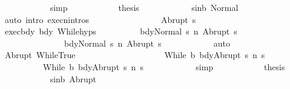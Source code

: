 \begin{isabellebody}
\ \ \ \ \ \ \ \ \ \ \isamarkupfalse%
\ simp\isanewline
\ \ \ \ \ \ \ \ \isamarkupfalse%
\ \isamarkupfalse%
\ {\isacharquery}thesis\isanewline
\ \ \ \ \ \ \ \ \ \ \isamarkupfalse%
\ s{\isacharunderscore}in{\isacharunderscore}b\ Normal\isanewline
\ \ \ \ \ \ \ \ \ \ \isamarkupfalse%
\ {\isacharparenleft}auto\ intro{\isacharcolon}\ execn{\isachardot}intros{\isacharparenright}\isanewline
\ \ \ \ \ \ \isamarkupfalse%
\isanewline
\ \ \ \ \ \ \ \ \isamarkupfalse%
\ {\isacharparenleft}Abrupt\ s{\isacharprime}{\isacharprime}{\isacharprime}{\isacharparenright}\isanewline
\ \ \ \ \ \ \ \ \isamarkupfalse%
\ exec{\isacharunderscore}bdy\ bdy\ While{\isachardot}hyps\isanewline
\ \ \ \ \ \ \ \ \isamarkupfalse%
\ {\isachardoublequoteopen}{\isasymGamma}{\isasymturnstile}{\isasymlangle}bdy{}{\isacharcomma}Normal\ s{\isasymrangle}\ {\isacharequal}n{\isasymRightarrow}\ Abrupt\ s{\isacharprime}{\isacharprime}{\isacharprime}{\isachardoublequoteclose}\ \isanewline
\ \ \ \ \ \ \ \ \ \ \ \ \ \ \ {\isachardoublequoteopen}{\isasymGamma}{\isasymturnstile}{\isasymlangle}bdy{}{\isacharcomma}Normal\ s{\isasymrangle}\ {\isacharequal}n{\isasymRightarrow}\ Abrupt\ s{\isacharprime}{\isacharprime}{\isacharprime}{\isachardoublequoteclose}\isanewline
\ \ \ \ \ \ \ \ \ \ \isamarkupfalse%
\ auto\isanewline
\ \ \ \ \ \ \ \ \isamarkupfalse%
\isanewline
\ \ \ \ \ \ \ \ \isamarkupfalse%
\ Abrupt\ WhileTrue\isanewline
\ \ \ \ \ \ \ \ \isamarkupfalse%
\ \isanewline
\ \ \ \ \ \ \ \ \ \ {\isachardoublequoteopen}{\isasymGamma}{\isasymturnstile}{\isasymlangle}While\ b\ bdy{}{\isacharcomma}Abrupt\ s{\isacharprime}{\isacharprime}{\isacharprime}{\isasymrangle}\ {\isacharequal}n{\isasymRightarrow}\ s{\isacharprime}{\isacharprime}{\isachardoublequoteclose}\ \isanewline
\ \ \ \ \ \ \ \ \ \ {\isachardoublequoteopen}{\isasymGamma}{\isasymturnstile}{\isasymlangle}While\ b\ bdy{}{\isacharcomma}Abrupt\ s{\isacharprime}{\isacharprime}{\isacharprime}{\isasymrangle}\ {\isacharequal}n{\isasymRightarrow}\ s{\isacharprime}{\isacharprime}{\isachardoublequoteclose}\isanewline
\ \ \ \ \ \ \ \ \ \ \isamarkupfalse%
\ simp\isanewline
\ \ \ \ \ \ \ \ \isamarkupfalse%
\ \isamarkupfalse%
\ {\isacharquery}thesis\isanewline
\ \ \ \ \ \ \ \ \ \ \isamarkupfalse%
\ s{\isacharunderscore}in{\isacharunderscore}b\ Abrupt\isanewline

\end{isabellebody}
